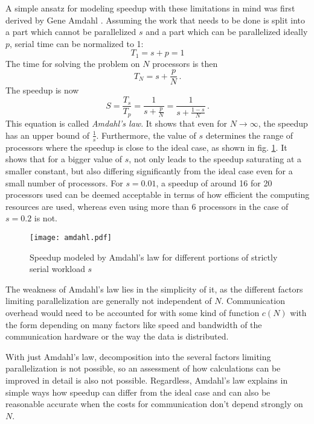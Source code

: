 \documentclass[main.tex]{subfiles}
\begin{document}
A simple ansatz for modeling speedup with these limitations in mind was first derived by Gene Amdahl \cite{amdahl_validity_1967}.
Assuming the work that needs to be done is split into a part which cannot be parallelized \(s\) and a part which can be parallelized ideally \(p\), serial time can be normalized to 1:
\begin{equation}
    T_1 = s + p = 1
\end{equation}
The time for solving the problem on \(N\) processors is then
\begin{equation}
    T_N = s + \frac{p}{N}\,.
\end{equation}
The speedup is now
\begin{equation}\label{eq:amdahls_law}
    S = \frac{T_s}{T_p} = \frac{1}{s + \frac{p}{N}} = \frac{1}{s + \frac{1 - s}{N}}\,.
\end{equation}
This equation is called \emph{Amdahl's law}.
It shows that even for \(N \to \infty\), the speedup has an upper bound of \(\frac{1}{s}\).
Furthermore, the value of \(s\) determines the range of processors where the speedup is close to the ideal case, as shown in fig. \ref{fig:amdahl}.
It shows that for a bigger value of \(s\), not only leads to the speedup saturating at a smaller constant, but also differing significantly from the ideal case even for a small number of processors.
For \(s = 0.01\), a speedup of around 16 for 20 processors used can be deemed acceptable in terms of how efficient the computing resources are used, whereas even using more than 6 processors in the case of \(s = 0.2\) is not.

\begin{figure}[ht!]
    \centering
    \texttt{[image: amdahl.pdf]}
    \caption{Speedup modeled by Amdahl's law for different portions of strictly serial workload \(s\)}
    \label{fig:amdahl}
\end{figure}

The weakness of Amdahl's law lies in the simplicity of it, as the different factors limiting parallelization are generally not independent of \(N\).
Communication overhead would need to be accounted for with some kind of function \(c(N)\) with the form depending on many factors like speed and bandwidth of the communication hardware or the way the data is distributed.

With just Amdahl's law, decomposition into the several factors limiting parallelization is not possible, so an assessment of how calculations can be improved in detail is also not possible.
Regardless, Amdahl's law explains in simple ways how speedup can differ from the ideal case and can also be reasonable accurate when the costs for communication don't depend strongly on \(N\).
\end{document}
